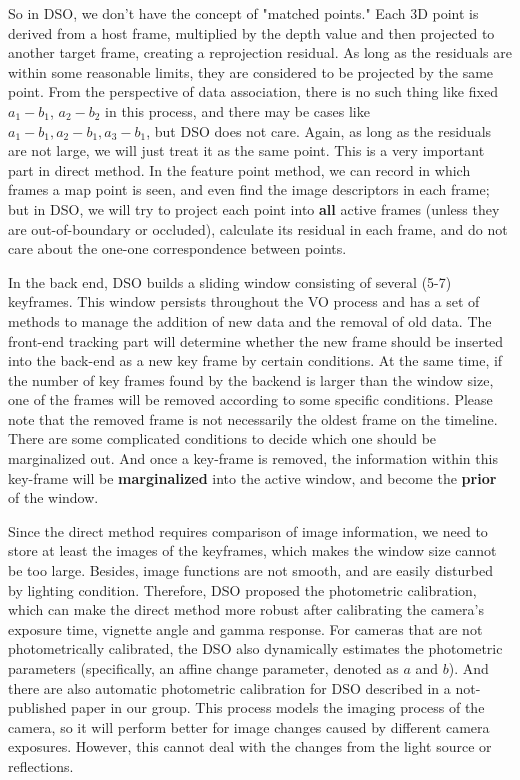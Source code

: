 \documentclass[a4paper,10pt]{article}
\begin{document}
	So in DSO, we don't have the concept of "matched points." Each 3D point is derived from a host frame, multiplied by the depth value and then projected to another target frame, creating a reprojection residual. As long as the residuals are within some reasonable limits, they are considered to be projected by the same point. From the perspective of data association, there is no such thing like fixed $a_1-b_1$, $a_2-b_2$ in this process, and there may be cases like $a_1-b_1, a_2-b_1, a_3-b_1$, but DSO does not care. Again, as long as the residuals are not large, we will just treat it as the same point. This is a very important part in direct method. In the feature point method, we can record in which frames a map point is seen, and even find the image descriptors in each frame; but in DSO, we will try to project each point into \textbf{all} active frames (unless they are out-of-boundary or occluded), calculate its residual in each frame, and do not care about the one-one correspondence between points.
	
	In the back end, DSO builds a sliding window consisting of several (5-7) keyframes. This window persists throughout the VO process and has a set of methods to manage the addition of new data and the removal of old data. The front-end tracking part will determine whether the new frame should be inserted into the back-end as a new key frame by certain conditions. At the same time, if the number of key frames found by the backend is larger than the window size, one of the frames will be removed according to some specific conditions. Please note that the removed frame is not necessarily the oldest frame on the timeline. There are some complicated conditions to decide which one should be marginalized out. And once a key-frame is removed, the information within this key-frame will be \textbf{marginalized} into the active window, and become the \textbf{prior} of the window. 
	
	Since the direct method requires comparison of image information, we need to store at least the images of the keyframes, which makes the window size cannot be too large. Besides, image functions are not smooth, and are easily disturbed by lighting condition. Therefore, DSO proposed the photometric calibration, which can make the direct method more robust after calibrating the camera's exposure time, vignette angle and gamma response. For cameras that are not photometrically calibrated, the DSO also dynamically estimates the photometric parameters (specifically, an affine change parameter, denoted as $a$ and $b$). And there are also automatic photometric calibration for DSO described in a not-published paper in our group. This process models the imaging process of the camera, so it will perform better for image changes caused by different camera exposures. However, this cannot deal with the changes from the light source or reflections.
\end{document}
